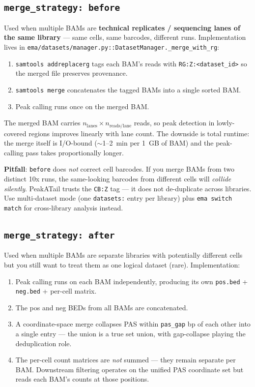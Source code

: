 \documentclass[11pt,a4paper]{article}
\begin{document}
\subsection{\texttt{merge\_strategy: before}}

Used when multiple BAMs are \textbf{technical replicates / sequencing lanes
of the same library} --- same cells, same barcodes, different runs.
Implementation lives in
\texttt{ema/datasets/manager.py::DatasetManager.\_merge\_with\_rg}:

\begin{enumerate}[noitemsep, leftmargin=*]
  \item \texttt{samtools addreplacerg} tags each BAM's reads with
        \texttt{RG:Z:<dataset\_id>} so the merged file preserves provenance.
  \item \texttt{samtools merge} concatenates the tagged BAMs into a single
        sorted BAM.
  \item Peak calling runs once on the merged BAM.
\end{enumerate}

The merged BAM carries $n_{\text{lanes}} \times n_{\text{reads/lane}}$ reads,
so peak detection in lowly-covered regions improves linearly with lane count.
The downside is total runtime: the merge itself is I/O-bound
($\sim$1--2~min per 1~GB of BAM) and the peak-calling pass takes
proportionally longer.

\textbf{Pitfall}: \texttt{before} does \emph{not} correct cell barcodes.
If you merge BAMs from two distinct 10x runs, the same-looking barcodes from
different cells will \emph{collide silently}. PeakATail trusts the
\texttt{CB:Z} tag --- it does not de-duplicate across libraries.
Use multi-dataset mode (one \texttt{datasets:} entry per library) plus
\texttt{ema switch match} for cross-library analysis instead.

\subsection{\texttt{merge\_strategy: after}}

Used when multiple BAMs are separate libraries with potentially different
cells but you still want to treat them as one logical dataset (rare).
Implementation:

\begin{enumerate}[noitemsep, leftmargin=*]
  \item Peak calling runs on each BAM independently, producing its own
        \texttt{pos.bed} + \texttt{neg.bed} + per-cell matrix.
  \item The pos and neg BEDs from all BAMs are concatenated.
  \item A coordinate-space merge collapses PAS within \texttt{pas\_gap} bp
        of each other into a single entry --- the union is a true set
        union, with gap-collapse playing the deduplication role.
  \item The per-cell count matrices are \emph{not} summed --- they remain
        separate per BAM. Downstream filtering operates on the unified PAS
        coordinate set but reads each BAM's counts at those positions.
\end{enumerate}
\end{document}
